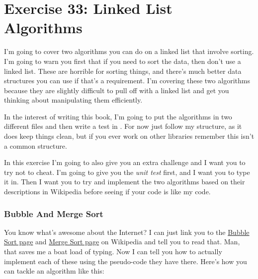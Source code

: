 \chapter{Exercise 33: Linked List Algorithms}

I'm going to cover two algorithms you can do on a linked list that involve
sorting.  I'm going to warn you first that if you need to sort the data, then
don't use a linked list.  These are horrible for sorting things, and there's
much better data structures you can use if that's a requirement.  I'm covering
these two algorithms because they are slightly difficult to pull off with a
linked list and get you thinking about manipulating them efficiently.

In the interest of writing this book, I'm going to put the algorithms in two
different files  and  then write a test
in .  For now just follow my structure, as it does
keep things clean, but if you ever work on other libraries remember this isn't
a common structure.

In this exercise I'm going to also give you an extra challenge and I want you
to try not to cheat.  I'm going to give you the \emph{unit test} first, and I
want you to type it in.  Then I want you to try and implement the two
algorithms based on their descriptions in Wikipedia before seeing if your code
is like my code.

\subsection{Bubble And Merge Sort}

You know what's awesome about the Internet?  I can just link you to the
\href{http://en.wikipedia.org/wiki/Bubble\_sort}{Bubble Sort page} and
\href{http://en.wikipedia.org/wiki/Merge\_sort}{Merge Sort page} on Wikipedia
and tell you to read that.  Man, that saves me a boat load of typing.   Now I
can tell you how to actually implement each of these using the pseudo-code they
have there.  Here's how you can tackle an algorithm like this:

